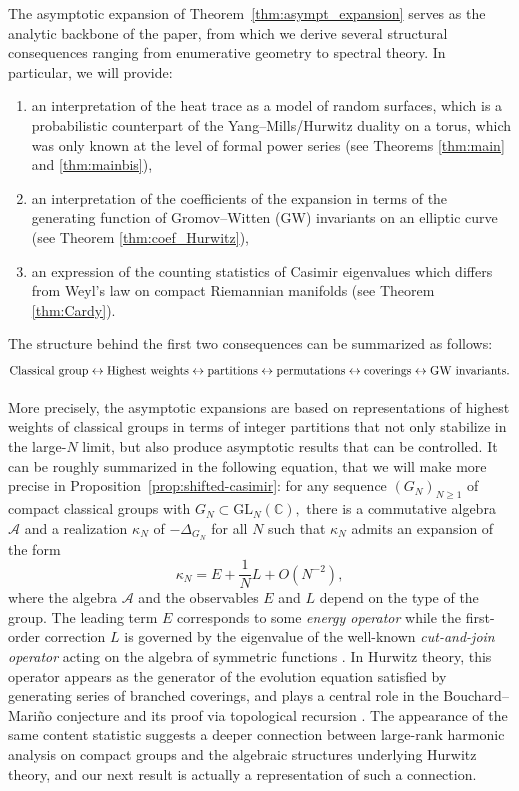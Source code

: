 \documentclass[11pt,a4paper,reqno]{article}
\theoremstyle{definition}
\theoremstyle{remark}
\newcommand{\build}[3]{\mathrel{\mathop{\kern 0pt#1}\limits_{#2}^{#3}}}
\newcommand\GL{{\mathrm{GL}}}
\newcommand\C{\mathbb{C}}
\begin{document}
The asymptotic expansion of Theorem~\ref{thm:asympt_expansion} serves as the analytic backbone of the paper, from which we derive several structural consequences ranging from enumerative geometry to spectral theory. In particular, we will provide:
\begin{enumerate}
\item an interpretation of the heat trace as a model of random surfaces, which is a probabilistic counterpart of the Yang--Mills/Hurwitz duality on a torus, which was  only known at the level of formal power series \cite{GT,GT2} (see Theorems \ref{thm:main} and  \ref{thm:mainbis}),
\item an interpretation of the coefficients of the expansion in terms of the generating function of Gromov--Witten (GW) invariants on an elliptic curve (see Theorem \ref{thm:coef_Hurwitz}),
\item an expression of the counting statistics of Casimir eigenvalues which differs from Weyl's law on compact Riemannian manifolds (see Theorem \ref{thm:Cardy}).
\end{enumerate}
The structure behind the first two consequences can be summarized as follows:
\[
\text{Classical group} \build{\leftrightarrow}{}{} \text{Highest weights} \build{\leftrightarrow}{}{} \text{partitions} \build{\leftrightarrow}{}{} \text{permutations} \build{\leftrightarrow}{}{} \text{coverings} \build{\leftrightarrow}{}{} \text{GW invariants}.
\]


More precisely, the asymptotic expansions are based on representations of highest weights of classical groups in terms of integer partitions that not only stabilize in the large-$N$ limit, but also produce asymptotic results that can be controlled. It can be roughly summarized in the following equation, that we will make more precise in Proposition~\ref{prop:shifted-casimir}: for any sequence $(G_N)_{N\geq 1}$  of compact classical groups with $G_N\subset\GL_N(\C),$ there is a commutative algebra $\mathcal{A}$ and a realization $\kappa_N$ of $-\Delta_{G_N}$ for all $N$ such that $\kappa_N$ admits an expansion of the form
\[
\kappa_N = E +\frac{1}{N}L + O(N^{-2}),
\]
where the algebra $\mathcal{A}$ and the observables $E$ and $L$ depend on the type of the group.  The leading term $E$ corresponds to some \emph{energy operator} while the first-order correction $L$ is governed by the eigenvalue of the well-known \emph{cut-and-join operator} acting on the algebra of symmetric functions \cite{Gou94}. In Hurwitz theory, this operator appears as the generator of the evolution equation satisfied by generating series of branched coverings, and plays a central role in the Bouchard--Mari\~no conjecture and its proof via topological recursion \cite{EMS11}. The appearance of the same content statistic suggests a deeper connection between large-rank harmonic analysis on compact groups and the algebraic structures underlying Hurwitz theory, and our next result is actually a representation of such a connection.
\end{document}
